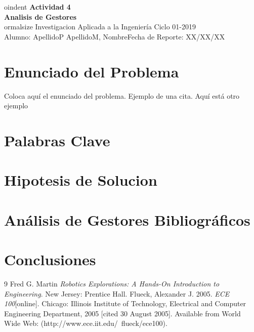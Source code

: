 \documentclass[a4paper, 11pt]{article}
\begin{document}

oindent
\large\textbf{Actividad 4} \\
\textbf{Analisis de Gestores} \\

ormalsize Investigacion Aplicada a la Ingeniería Ciclo 01-2019 \\
Alumno: ApellidoP ApellidoM, Nombre\hfill Fecha de Reporte: XX/XX/XX \\
 

\section*{Enunciado del Problema}
Coloca aquí el enunciado del problema. Ejemplo de una cita\cite[p.219]{Robotics}. Aquí está otro ejemplo\cite{Flueck}

\section*{Palabras Clave}
\lipsum[2]

\section*{Hipotesis de Solucion}
\lipsum[3]

\section*{Análisis de Gestores Bibliográficos}
\lipsum[4]

\section*{Conclusiones}
\lipsum[5]



\begin{thebibliography}{9}
 Fred G. Martin \emph{Robotics Explorations: A Hands-On Introduction to Engineering}. New Jersey: Prentice Hall.
  Flueck, Alexander J. 2005. \emph{ECE 100}[online]. Chicago: Illinois Institute of Technology, Electrical and Computer Engineering Department, 2005 [cited 30
August 2005]. Available from World Wide Web: (http://www.ece.iit.edu/~flueck/ece100).
\end{thebibliography}
\end{document}
